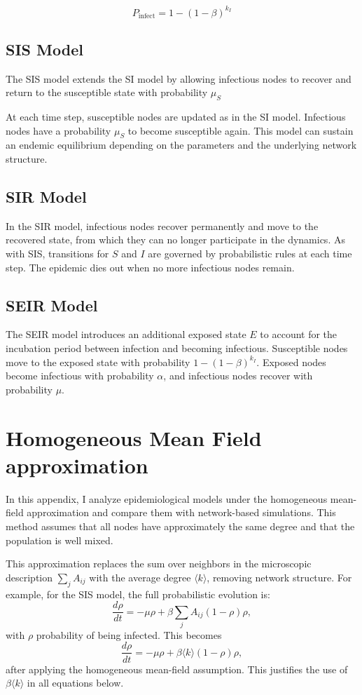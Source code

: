 \[
P_{\text{infect}} = 1 - (1 - \beta)^{k_I}
\]

\subsection{SIS Model}

The SIS model extends the SI model by allowing infectious nodes to recover and return to the susceptible state with probability $\mu_S$

At each time step, susceptible nodes are updated as in the SI model. Infectious nodes have a probability $\mu_S$ to become susceptible again. This model can sustain an endemic equilibrium depending on the parameters and the underlying network structure.

\subsection{SIR Model}

In the SIR model, infectious nodes recover permanently and move to the recovered state, from which they can no longer participate in the dynamics.
As with SIS, transitions for $S$ and $I$ are governed by probabilistic rules at each time step. The epidemic dies out when no more infectious nodes remain.

\subsection{SEIR Model}

The SEIR model introduces an additional exposed state $E$ to account for the incubation period between infection and becoming infectious.
Susceptible nodes move to the exposed state with probability $1 - (1 - \beta)^{k_I}$. Exposed nodes become infectious with probability $\alpha$, and infectious nodes recover with probability $\mu$.


\section{Homogeneous Mean Field approximation}
\label{app:Homogeneous_MF}

In this appendix, I analyze epidemiological models under the homogeneous mean-field approximation and compare them with network-based simulations. This method assumes that all nodes have approximately the same degree and that the population is well mixed.

This approximation replaces the sum over neighbors in the microscopic description $\sum_j A_{ij}$ with the average degree $\langle k \rangle$, removing network structure. For example, for the SIS model, the full probabilistic evolution is:
\begin{equation}
\frac{d\rho}{dt} = -\mu \rho + \beta \sum_j A_{ij}(1 - \rho)\rho,
\end{equation}
with $\rho$ probability of being infected.
This becomes
\begin{equation}
\frac{d\rho}{dt} = -\mu \rho + \beta \langle k \rangle (1 - \rho)\rho,
\end{equation}
after applying the homogeneous mean-field assumption. This justifies the use of $\beta \langle k \rangle$ in all equations below.

